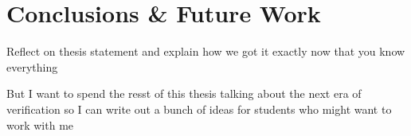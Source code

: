 \chapter{Conclusions \& Future Work}
\label{chapt:conclusions}

Reflect on thesis statement and explain how we got it exactly now that you know everything

But I want to spend the resst of this thesis talking about the next era of verification so I can write out a bunch of ideas for students who might want to work with me


